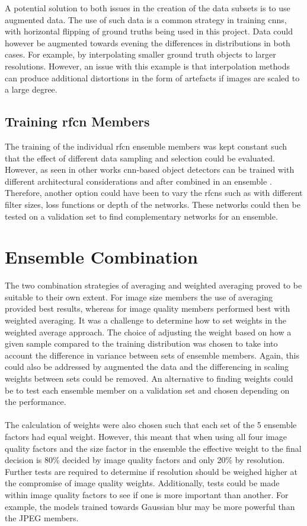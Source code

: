 A potential solution to both issues in the creation of the data subsets is to use augmented data. The use of such data is a common strategy in training \glspl{cnn}, with horizontal flipping of ground truths being used in this project. Data could however be augmented towards evening the differences in distributions in both cases. For example, by interpolating smaller ground truth objects to larger resolutions. However, an issue with this example is that interpolation methods can produce additional distortions in the form of artefacts if images are scaled to a large degree.

\subsection{Training \gls{rfcn} Members}
The training of the individual \gls{rfcn} ensemble members was kept constant such that the effect of different data sampling and selection could be evaluated. However, as seen in other works \gls{cnn}-based object detectors can be trained with different architectural considerations and after combined in an ensemble \cite{deepres}. Therefore, another option could have been to vary the \glspl{rfcn} such as with different filter sizes, loss functions or depth of the networks. These networks could then be tested on a validation set to find complementary networks for an ensemble.

\section{Ensemble Combination}
The two combination strategies of averaging and weighted averaging proved to be suitable to their own extent. For image size members the use of averaging provided best results, whereas for image quality members performed best with weighted averaging. It was a challenge to determine how to set weights in the weighted average approach. The choice of adjusting the weight based on how a given sample compared to the training distribution was chosen to take into account the difference in variance between sets of ensemble members. Again, this could also be addressed by augmented the data and the differencing in scaling weights between sets could be removed. An alternative to finding weights could be to test each ensemble member on a validation set and chosen depending on the performance.
\\\\
The calculation of weights were also chosen such that each set of the 5 ensemble factors had equal weight. However, this meant that when using all four image quality factors and the size factor in the ensemble the effective weight to the final decision is 80\% decided by image quality factors and only 20\% by resolution. Further tests are required to determine if resolution should be weighed higher at the compromise of image quality weights. Additionally, tests could be made within image quality factors to see if one is more important than another. For example, the models trained towards Gaussian blur may be more powerful than the JPEG members.

